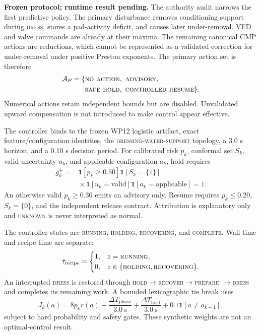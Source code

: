 \documentclass[10pt,twocolumn]{article}
\begin{document}
\textbf{Frozen protocol; runtime result pending.} The authority audit narrows
the first predictive policy. The primary disturbance removes conditioning
support during \textsc{dress}, stores a pad-activity deficit, and causes later
under-removal. VFD and valve commands are already at their maxima. The
remaining canonical CMP actions are reductions, which cannot be represented as
a validated correction for under-removal under positive Preston exponents.
The primary action set is therefore
\[
\begin{aligned}
\mathcal A_P=\{&\textsc{no action},\ \textsc{advisory},\\
               &\textsc{safe hold},\ \textsc{controlled resume}\}.
\end{aligned}
\]
Numerical actions retain independent bounds but are disabled. Unvalidated
upward compensation is not introduced to make control appear effective.

The controller binds to the frozen WP12 logistic artifact, exact
feature/configuration identities, the \textsc{dressing-water-support}
topology, a 3.0 s horizon, and a 0.10 s decision period. For calibrated risk
$p_k$, conformal set $S_k$, valid uncertainty $u_k$, and applicable
configuration $a_k$, hold requires
\begin{equation}
\begin{aligned}
g_k^+={}&\mathbf 1[p_k\ge0.50]\mathbf 1[S_k=\{1\}]\\
        &{}\times\mathbf 1[u_k=\mathrm{valid}]
        \mathbf 1[a_k=\mathrm{applicable}]=1.
\end{aligned}
\label{eq:control-gate}
\end{equation}
An otherwise valid $p_k\ge0.30$ emits an advisory only. Resume requires
$p_k\le0.20$, $S_k=\{0\}$, and the independent release contract. Attribution
is explanatory only and \textsc{unknown} is never interpreted as normal.

The controller states are \textsc{running}, \textsc{holding},
\textsc{recovering}, and \textsc{complete}. Wall time and recipe time are
separate:
\begin{equation}
\dot\tau_{\mathrm{recipe}}=
\begin{cases}
1,&z=\textsc{running},\\
0,&z\in\{\textsc{holding},\textsc{recovering}\}.
\end{cases}
\label{eq:recipe-clock}
\end{equation}
An interrupted \textsc{dress} is restored through
\textsc{hold}$\rightarrow$\textsc{recover}$\rightarrow$\textsc{prepare}
$\rightarrow$\textsc{dress} and completes its remaining work. A bounded
lexicographic tie break uses
\begin{equation}
J_k(a)=8p_kr(a)+\frac{\Delta T_{\mathrm{phase}}}{3.0\ \mathrm{s}}
+\frac{\Delta T_{\mathrm{hold}}}{3.0\ \mathrm{s}}
+0.1\mathbf 1[a\ne a_{k-1}],
\label{eq:control-score}
\end{equation}
subject to hard probability and safety gates. These synthetic weights are not
an optimal-control result.
\end{document}

